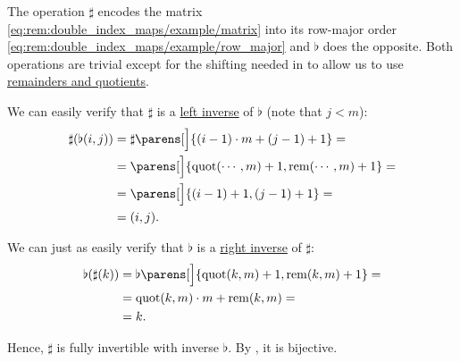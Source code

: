 \begin{remark}
  The operation \( \sharp \) encodes the matrix \eqref{eq:rem:double_index_maps/example/matrix} into its row-major order \eqref{eq:rem:double_index_maps/example/row_major} and \( \flat \) does the opposite. Both operations are trivial except for the shifting needed in to allow us to use \hyperref[def:euclidean_domain]{remainders and quotients}.

  We can easily verify that \( \sharp \) is a \hyperref[def:function_invertibility_categorical/left]{left inverse} of \( \flat \) (note that \( j < m \)):
  \begin{align*}
    \sharp(\flat(i, j))
    &=
    \sharp\parens[\Big]{ (i - 1) \cdot m + (j - 1) + 1 }
    = \\ &=
    \parens[\Big]{ \quot(\cdots, m) + 1, \rem(\cdots, m) + 1 }
    = \\ &=
    \parens[\Big]{ (i - 1) + 1, (j - 1) + 1 }
    = \\ &=
    (i, j).
  \end{align*}

  We can just as easily verify that \( \flat \) is a \hyperref[def:function_invertibility_categorical/right]{right inverse} of \( \sharp \):
  \begin{align*}
    \flat(\sharp(k))
    &=
    \flat\parens[\Big]{ \quot(k, m) + 1, \rem(k, m) + 1 }
    = \\ &=
    \quot(k, m) \cdot m + \rem(k, m)
    = \\ &=
    k.
  \end{align*}

  Hence, \( \sharp \) is fully invertible with inverse \( \flat \). By , it is bijective.
\end{remark}
